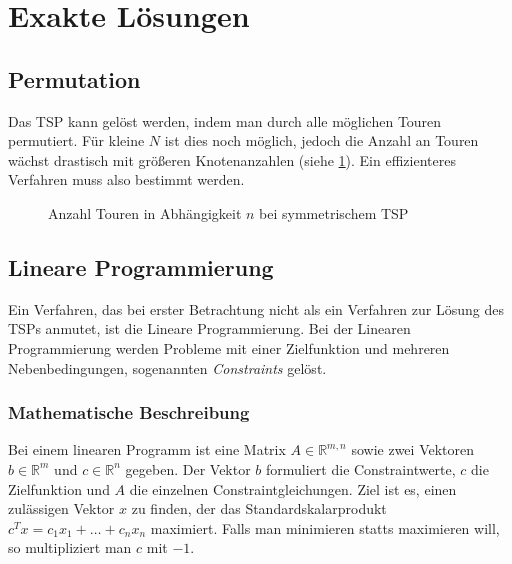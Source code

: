 \documentclass[a4paper, 11pt]{article}
\begin{document}
\section{Exakte Lösungen}

\subsection{Permutation}

Das TSP kann gelöst werden, indem man durch alle möglichen Touren permutiert.
Für kleine $N$ ist dies noch möglich, jedoch die Anzahl an Touren wächst
drastisch mit größeren Knotenanzahlen (siehe \ref{fig:faculty_graph}). Ein
effizienteres Verfahren muss also bestimmt werden.

\begin{figure}
  \centering
  \label{fig:faculty_graph}
  \caption{Anzahl Touren in Abhängigkeit $n$ bei symmetrischem TSP}
\end{figure}

\subsection{Lineare Programmierung}

Ein Verfahren, das bei erster Betrachtung nicht als ein Verfahren zur Lösung
des TSPs anmutet, ist die Lineare Programmierung. Bei der Linearen Programmierung
werden Probleme mit einer Zielfunktion und mehreren Nebenbedingungen,
sogenannten \textit{Constraints} gelöst.

\subsubsection{Mathematische Beschreibung}
Bei einem linearen Programm ist eine Matrix $A \in \mathbb{R}^{m,n}$ sowie
zwei Vektoren $b \in \mathbb{R}^m$ und $c \in \mathbb{R}^n$ gegeben. Der
Vektor $b$ formuliert die Constraintwerte, $c$ die Zielfunktion und $A$ die
einzelnen Constraintgleichungen. Ziel ist es, einen
zulässigen Vektor $x$ zu finden, der das Standardskalarprodukt
$c^Tx = c_1x_1 + \ldots + c_nx_n$ maximiert. Falls man minimieren statts
maximieren will, so multipliziert man $c$ mit $-1$. 
\end{document}
